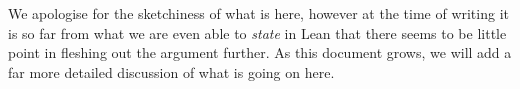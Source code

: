 We apologise for the sketchiness of what is here, however at the time of writing it is so far from what we are even able to \emph{state} in Lean that there seems to be little point in fleshing out the argument further. As this document grows, we will add a far more detailed discussion of what is going on here. 






